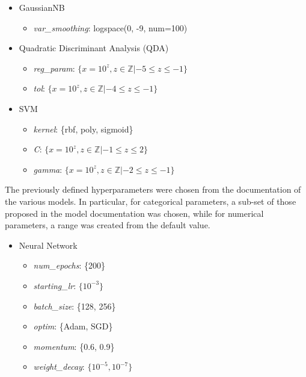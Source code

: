 \documentclass[../main]{subfiles}
\begin{document}
\begin{itemize}
    \item GaussianNB
    \begin{itemize}
        \item \textit{var\_smoothing}: logspace(0, -9, num=100)
    \end{itemize}
    \item Quadratic Discriminant Analysis (QDA)
    \begin{itemize}
        \item \textit{reg\_param}: $\{x = 10^z, z \in \mathbb{Z}|-5 \leq z \leq -1\}$
        \item \textit{tol}: $\{x = 10^z, z \in \mathbb{Z}|-4 \leq z \leq -1\}$
    \end{itemize}
\end{itemize}

\begin{itemize}
    \item SVM
    \begin{itemize}
        \item \textit{kernel}: \{rbf, poly, sigmoid\}
        \item \textit{C}: $\{x = 10^z, z \in \mathbb{Z}|-1 \leq z \leq 2\}$
        \item \textit{gamma}: $\{x = 10^z, z \in \mathbb{Z}|-2 \leq z \leq -1\}$
    \end{itemize}
\end{itemize}

The previously defined hyperparameters were chosen from the documentation of the various models.
In particular, for categorical parameters, a sub-set of those proposed in the model documentation was chosen, while for numerical parameters, a range was created from the default value.
\begin{itemize}
    \item Neural Network
    \begin{itemize}
        \item \textit{num\_epochs}: \{200\}
        \item \textit{starting\_lr}: $\{10^{-3}\}$
        \item \textit{batch\_size}: \{128, 256\}
        \item \textit{optim}: \{Adam, SGD\}
        \item \textit{momentum}: \{0.6, 0.9\}
        \item \textit{weight\_decay}: $\{10^{-5}, 10^{-7}\}$
    \end{itemize}
\end{itemize}
\end{document}
